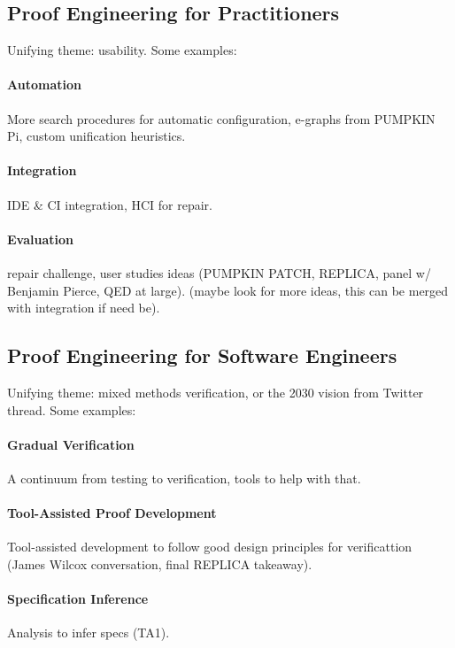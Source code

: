 \subsection*{Proof Engineering for Practitioners}

Unifying theme: usability. Some examples:

\paragraph{Automation} More search procedures for automatic configuration, e-graphs from PUMPKIN Pi, custom unification heuristics.

\paragraph{Integration} IDE \& CI integration, HCI for repair.

\paragraph{Evaluation} repair challenge, user studies ideas (PUMPKIN PATCH, REPLICA, panel w/ Benjamin Pierce, QED at large). (maybe look for more ideas, this can be merged with integration if need be).

\subsection*{Proof Engineering for Software Engineers}

Unifying theme: mixed methods verification, or the 2030 vision from Twitter thread. Some examples:

\paragraph{Gradual Verification} A continuum from testing to verification, tools to help with that.

\paragraph{Tool-Assisted Proof Development} Tool-assisted development to follow good design principles for verificattion (James Wilcox conversation, final REPLICA takeaway).

\paragraph{Specification Inference} Analysis to infer specs (TA1).

